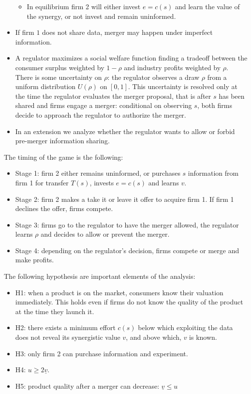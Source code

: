 \documentclass[a4paper,leqno]{article}%
\newcommand{\uv}{\underline{v}}
\begin{document}
\begin{itemize}
\begin{itemize}
        \item In equilibrium firm 2 will either invest $e=c(s)$ and learn the value of the synergy, or not invest and remain uninformed.
    \end{itemize}
    \item If firm $1$ does not share data, merger may happen under imperfect information.
    \item A regulator maximizes a social welfare function finding a tradeoff between the consumer surplus weighted by $1-\rho$ and industry profits weighted by $\rho$. There is some uncertainty on $\rho$: the regulator observes a draw $\rho$ from a uniform distribution $U(\rho)$ on $[0,1]$. This uncertainty is resolved only at the time the regulator evaluates the merger proposal, that is after $s$ has been shared and firms engage a merger: conditional on observing $s$, both firms decide to approach the regulator to authorize the merger.
    \item In an extension we analyze whether the regulator wants to allow or forbid pre-merger information sharing.
\medskip
\end{itemize}

The timing of the game is the following:


\begin{itemize}[label={-}]
    \item Stage 1: firm 2 either remains uninformed, or purchases $s$ information from firm 1 for transfer $T(s)$, invests $e=c(s)$ and learns $v$.
    \item Stage 2: firm 2 makes a take it or leave it offer to acquire firm 1. If firm 1 declines the offer, firms compete.
    \item Stage 3: firms go to the regulator to have the merger allowed, the regulator learns $\rho$ and decides to allow or prevent the merger.
    \item Stage 4: depending on the regulator's decision, firms compete or merge and make profits.
\end{itemize}




The following hypothesis are important elements of the analysis:

\begin{itemize}[label={-}]
    \item H1: when a product is on the market, consumers know their valuation immediately. This holds even if firms do not know the quality of the product at the time they launch it. 
    \item H2: there exists a minimum effort $c(s)$ below which exploiting the data does not reveal its synergistic value $v$, and above which, $v$ is known.
    \item H3: only firm 2 can purchase information and experiment.
    \item H4: $u\geq 2\uv$.
    \item H5: product quality after a merger can decrease: $\uv\leq u$
\end{itemize}
\end{document}
